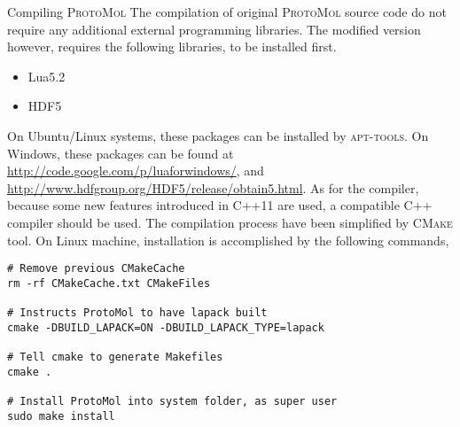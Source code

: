 \begin{section} {Compiling \textsc{ProtoMol}}
The compilation of original \textsc{ProtoMol} source code do not require any additional external programming libraries. The modified version however, requires the following libraries, to be installed first. 
\begin{itemize}{}{}
\item Lua5.2
\item HDF5
\end{itemize}
On Ubuntu/Linux systems, these packages can be installed by \textsc{apt-tools}. On Windows, these packages can be found at \url{http://code.google.com/p/luaforwindows/}, and \url{http://www.hdfgroup.org/HDF5/release/obtain5.html}. As for the compiler, because some new features introduced in C++11 are used, a compatible C++ compiler should be used. The compilation process have been simplified by \textsc{CMake} tool. On Linux machine, installation is accomplished by the following commands, 
\lstset{language=bash} 
\begin{lstlisting}
# Remove previous CMakeCache
rm -rf CMakeCache.txt CMakeFiles

# Instructs ProtoMol to have lapack built
cmake -DBUILD_LAPACK=ON -DBUILD_LAPACK_TYPE=lapack 

# Tell cmake to generate Makefiles
cmake .

# Install ProtoMol into system folder, as super user
sudo make install
\end{lstlisting}
\end{section}
